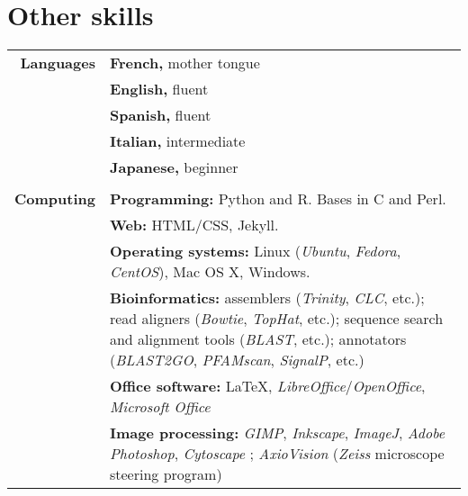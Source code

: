 \documentclass[letterpaper,10pt]{article}
\begin{document}
\section{Other skills}
\begin{tabular}{r|p{13cm}}

\textbf{Languages}
& \textbf{French,} mother tongue \\
& \textbf{English,} fluent \\
& \textbf{Spanish,} fluent \\
& \textbf{Italian,} intermediate \\
& \textbf{Japanese,} beginner \\

\multicolumn{2}{c}{} \\

\textbf{Computing}

& \textbf{Programming:} Python and R. Bases in C and Perl.
  \vspace{2mm} \\

& \textbf{Web:} HTML/CSS, Jekyll.
  \vspace{2mm} \\

& \textbf{Operating systems:} Linux (\emph{Ubuntu}, \emph{Fedora},
  \emph{CentOS}), Mac OS X, Windows.
  \vspace{2mm} \\

& \textbf{Bioinformatics:} assemblers (\emph{Trinity}, \emph{CLC}, etc.);
  read aligners (\emph{Bowtie}, \emph{TopHat}, etc.);
  sequence search and alignment tools (\emph{BLAST}, etc.);
  annotators (\emph{BLAST2GO}, \emph{PFAMscan}, \emph{SignalP}, etc.)
  \vspace{2mm} \\

& \textbf{Office software:} \LaTeX, \emph{LibreOffice}/\emph{OpenOffice},
  \emph{Microsoft Office}
  \vspace{2mm} \\

& \textbf{Image processing:} \emph{GIMP}, \emph{Inkscape}, \emph{ImageJ},
  \emph{Adobe Photoshop}, \emph{Cytoscape} ; \emph{AxioVision} (\emph{Zeiss}
  microscope steering program) \\

\end{tabular}
\end{document}

